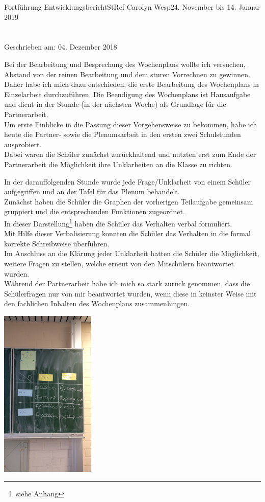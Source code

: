 \documentclass[oneside,openany,headings=optiontotoc,11pt,numbers=noenddot]{article}
\begin{document}
\begin{worksheet}{Fortführung Entwicklungsbericht}{StRef\grq{} Carolyn Wesp}{24. November bis 14. Januar 2019}
		\section*{}
		\tiny{Geschrieben am: 04. Dezember 2018}\small
		\par\noindent
		Bei der Bearbeitung und Besprechung des Wochenplans wollte ich versuchen, Abstand von der reinen Bearbeitung und dem sturen Vorrechnen zu gewinnen. Daher habe ich mich dazu entschieden, die erste Bearbeitung des Wochenplans in Einzelarbeit durchzuführen. Die Beendigung des Wochenplans ist Hausaufgabe und dient in der Stunde (in der nächsten Woche) als Grundlage für die Partnerarbeit.\\
		Um erste Einblicke in die Passung dieser Vorgehensweise zu bekommen, habe ich heute die Partner- sowie die Plenumsarbeit in den ersten zwei Schulstunden ausprobiert.\\
		Dabei waren die Schüler zunächst zurückhaltend und nutzten erst zum Ende der Partnerarbeit die Möglichkeit ihre Unklarheiten an die Klasse zu richten.\\
		\par\noindent
		In der darauffolgenden Stunde wurde jede Frage/Unklarheit von einem Schüler aufgegriffen und an der Tafel für das Plenum behandelt.\\
		Zunächst haben die Schüler die Graphen der vorherigen Teilaufgabe gemeinsam gruppiert und die entsprechenden Funktionen zugeordnet.\\
		In dieser Darstellung\footnote{siehe Anhang} haben die Schüler das Verhalten verbal formuliert.\\
		Mit Hilfe dieser Verbalisierung konnten die Schüler das Verhalten in die formal korrekte Schreibweise überführen.\\
		Im Anschluss an die Klärung jeder Unklarheit hatten die Schüler die Möglichkeit, weitere Fragen zu stellen, welche erneut von den Mitschülern beantwortet wurden.\\		
		Während der Partnerarbeit habe ich mich so stark zurück genommen, dass die Schülerfragen nur von mir beantwortet wurden, wenn diese in keinster Weise mit den fachlichen Inhalten des Wochenplans zusammenhingen.\\
		\begin{center}
			\includegraphics[width=0.34\textwidth]{../Tabelle_Verhalten.jpg}

\end{center}
\end{worksheet}
\end{document}

